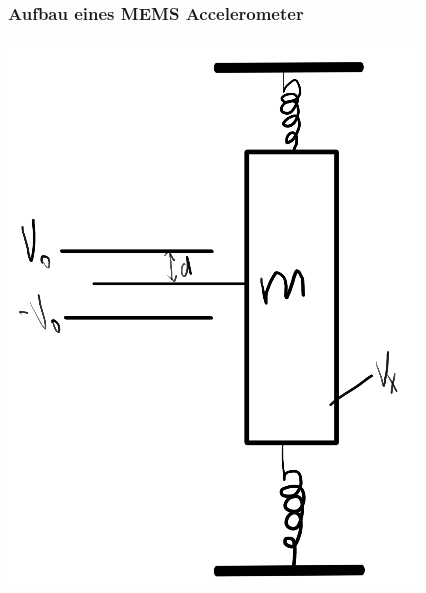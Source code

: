 \documentclass[10pt,a4paper,oneside]{beamer}
\begin{document}
\begin{frame}
	\frametitle{Aufbau eines MEMS Accelerometer}
\begin{center}
	
\includegraphics[height=0.8\textheight,keepaspectratio=true]{images/aufbau.png}

\end{center}
\end{frame}
\end{document}
